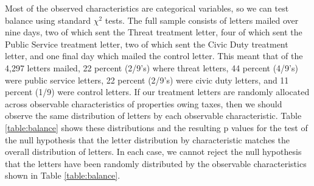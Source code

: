 \documentclass[12pt,titlepage]{article}
\begin{document}
  Most of the observed characteristics are categorical variables, so we
can test balance using standard $\chi^2$ tests. The full sample consists of letters mailed over nine days, two of which sent the Threat treatment letter, four of which sent the Public Service treatment letter, two of which sent the Civic Duty treatment letter, and one final day which mailed the control letter.  This meant that of the 4,297 letters mailed, 22 percent (2/9's) where threat letters, 44 percent (4/9's) were public service letters, 22 percent (2/9's) were civic duty letters, and 11 percent (1/9) were control letters.  If our treatment letters are randomly allocated across observable characteristics of properties owing taxes, then we should observe the same distribution of letters by each observable characteristic.  Table  \ref{table:balance} shows these distributions and the resulting p values for the test of the null hypothesis that the letter distribution by characteristic matches the overall distribution of letters.  In each case, we cannot reject the null hypothesis that the letters have been randomly distributed by the observable characteristics shown in Table \ref{table:balance}. 
\end{document}
